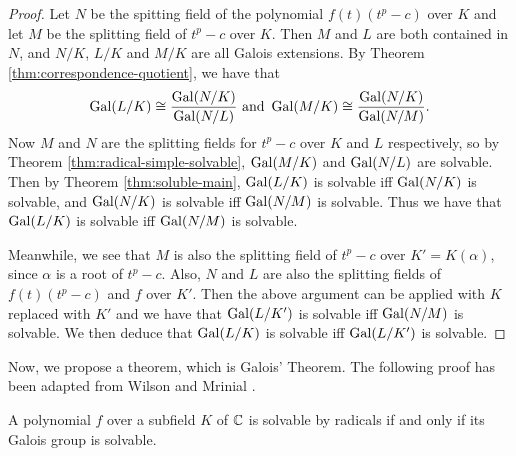 \begin{proof}
	Let $N$ be the spitting field of the polynomial $f(t)(t^p - c)$ over $K$ and let $M$ be the splitting field of $t^p -c $ over $K$. Then $M$ and $L$ are both contained in $N$, and $N/K$, $L/K$ and $M/K$ are all Galois extensions. By Theorem \ref{thm:correspondence-quotient}, we have that 
	$$ \operatorname{Gal}(L / K) \cong \frac{\operatorname{Gal}(N / K)}{\operatorname{Gal}(N / L)} \text{ and } \operatorname{Gal}(M / K) \cong \frac{\operatorname{Gal}(N / K)}{\operatorname{Gal}(N / M)}.$$
	Now $M$ and $N$ are the splitting fields for $t^p - c$ over $K$ and $L$ respectively, so by Theorem \ref{thm:radical-simple-solvable}, $\operatorname{Gal}(M/K)$ and $\operatorname{Gal}(N / L)$ are solvable. Then by Theorem \ref{thm:soluble-main}, $\operatorname{Gal}(L/K)$ is solvable iff $\operatorname{Gal}(N/K)$ is solvable, and $\operatorname{Gal}(N / K)$ is solvable iff $\operatorname{Gal}(N/M)$ is solvable. Thus we have that $\operatorname{Gal}(L/K)$ is solvable iff $\operatorname{Gal}(N/M)$ is solvable. 
	
	Meanwhile, we see that $M$ is also the splitting field of $t^p - c$ over $K' = K(\alpha)$, since $\alpha$ is a root of $t^p - c$. Also, $N$ and $L$ are also the splitting fields of $f(t) (t^p - c)$ and $f$ over $K'$. Then the above argument can be applied with $K$ replaced with $K'$ and we have that $\operatorname{Gal}(L/K')$ is solvable iff $\operatorname{Gal}(N/M)$ is solvable. We then deduce that $\operatorname{Gal}(L/K)$ is solvable iff $\operatorname{Gal}(L/K')$ is solvable. 
\end{proof}

Now, we propose a theorem, which is Galois' Theorem. The following proof has been adapted from Wilson \cite{cambridge-galois-lecture-polynomials} and Mrinial \cite{Abel-Ruffini}.

\begin{theorem}\label{thm:galois-theorem}
	A polynomial $f$ over a subfield $K$ of $\mathbb C$ is solvable by radicals if and only if its Galois group is solvable.
\end{theorem}

